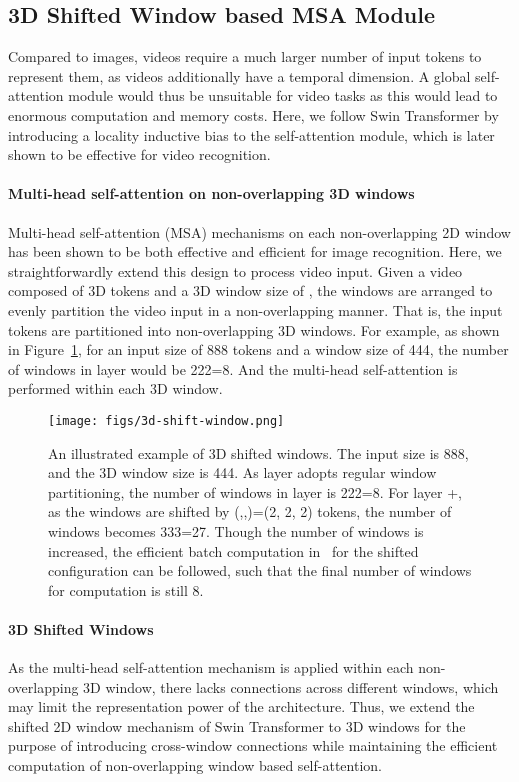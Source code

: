 \documentclass{article}
\begin{document}
\subsection{3D Shifted Window based MSA Module}
Compared to images, videos require a much larger number of input tokens to represent them, as videos additionally have a temporal dimension. A global self-attention module would thus be unsuitable for video tasks as this would lead to enormous computation and memory costs. Here, we follow Swin Transformer by introducing a locality inductive bias to the self-attention module, which is later shown to be effective for video recognition. 




\paragraph{Multi-head self-attention on non-overlapping 3D windows} 
Multi-head self-attention (MSA) mechanisms on each non-overlapping 2D window has been shown to be both effective and efficient for image recognition. Here, we straightforwardly extend this design to process video input. Given a video composed of  3D tokens and a 3D window size of , the windows are arranged to evenly partition the video input in a non-overlapping manner. That is, the input tokens are partitioned into  non-overlapping 3D windows.
For example, as shown in Figure~\ref{fig:shift-window}, for an input size of 888 tokens and a window size of 444, the number of windows in layer  would be 222=8.
And the multi-head self-attention is performed within each 3D window.



\begin{figure}
    \centering
    \texttt{[image: figs/3d-shift-window.png]}
    \caption{An illustrated example of 3D shifted windows. The input size  is 888, and the 3D window size  is 444. As layer  adopts regular window partitioning, the number of windows in layer  is 222=8. For layer +, as the windows are shifted by (,,)=(2, 2, 2) tokens, the number of windows becomes 333=27. Though the number of windows is increased, the efficient batch computation in~\cite{liu2021swin} for the shifted configuration can be followed, such that the final number of windows for computation is still 8.}
    \label{fig:shift-window}
\end{figure}

\paragraph{3D Shifted Windows}\label{sec:att}
As the multi-head self-attention mechanism is applied within each non-overlapping 3D window, there lacks connections across different windows, which may limit the representation power of the architecture. Thus, we extend the shifted 2D window mechanism of Swin Transformer to 3D windows for the purpose of introducing cross-window connections while maintaining the efficient computation of non-overlapping window based self-attention.
\end{document}
